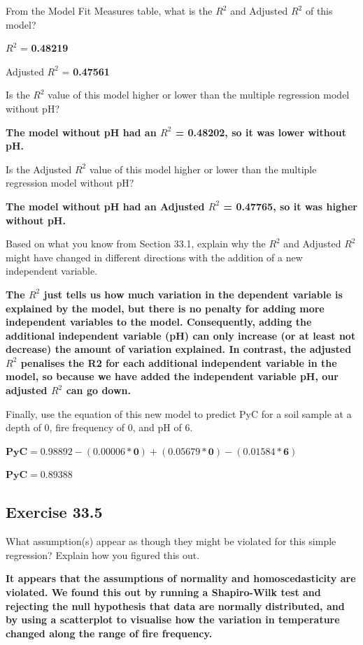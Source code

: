\documentclass[
  openany]{krantz}
\begin{document}
From the Model Fit Measures table, what is the \(R^{2}\) and Adjusted \(R^{2}\) of this model?

\(R^{2}\) = \textbf{0.48219}

Adjusted \(R^{2}\) = \textbf{0.47561}

Is the \(R^{2}\) value of this model higher or lower than the multiple regression model without pH?

\textbf{The model without pH had an \(R^{2}\) = 0.48202, so it was lower without pH.}

Is the Adjusted \(R^{2}\) value of this model higher or lower than the multiple regression model without pH?

\textbf{The model without pH had an Adjusted \(R^{2}\) = 0.47765, so it was higher without pH.}

Based on what you know from Section 33.1, explain why the \(R^{2}\) and Adjusted \(R^{2}\) might have changed in different directions with the addition of a new independent variable.

\textbf{The \(R^{2}\) just tells us how much variation in the dependent variable is explained by the model, but there is no penalty for adding more independent variables to the model. Consequently, adding the additional independent variable (pH) can only increase (or at least not decrease) the amount of variation explained. In contrast, the adjusted \(R^{2}\) penalises the R2 for each additional independent variable in the model, so because we have added the independent variable pH, our adjusted \(R^{2}\) can go down.}

Finally, use the equation of this new model to predict PyC for a soil sample at a depth of 0, fire frequency of 0, and pH of 6.

\(\mathbf{PyC = 0.98892 - (0.00006*0) + (0.05679 * 0) - (0.01584 * 6)}\)

\(\mathbf{PyC = 0.89388}\)

\hypertarget{exercise-33.5}{%
\subsection{Exercise 33.5}\label{exercise-33.5}}

What assumption(s) appear as though they might be violated for this simple regression? Explain how you figured this out.

\textbf{It appears that the assumptions of normality and homoscedasticity are violated. We found this out by running a Shapiro-Wilk test and rejecting the null hypothesis that data are normally distributed, and by using a scatterplot to visualise how the variation in temperature changed along the range of fire frequency.}
\end{document}
